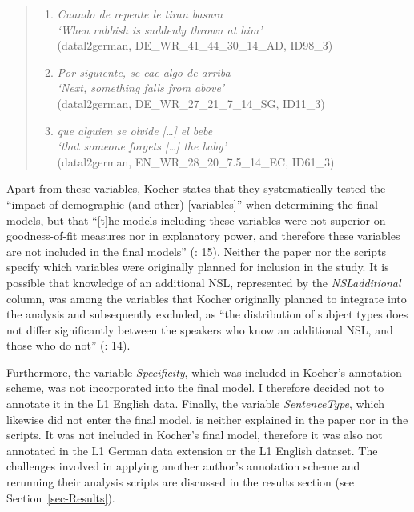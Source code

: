 \documentclass[
  letterpaper,
  DIV=11,
  numbers=noendperiod]{scrartcl}
\begin{document}
\begin{quote}
\begin{enumerate}
\def\labelenumi{\arabic{enumi}.}
\setcounter{enumi}{38}
\item
  \emph{Cuando de repente le tiran basura\\
  `\emph{When rubbish is suddenly thrown at him}'}\\
  (datal2german, DE\_WR\_41\_44\_30\_14\_AD, ID98\_3)
\item
  \emph{Por siguiente, se cae algo de arriba\\
  `\emph{Next, something falls from above}'}\\
  (datal2german, DE\_WR\_27\_21\_7\_14\_SG, ID11\_3)
\item
  \emph{que alguien se olvide {[}\ldots{]} el bebe\\
  `\emph{that someone forgets {[}\ldots{]} the baby}'}\\
  (datal2german, EN\_WR\_28\_20\_7.5\_14\_EC, ID61\_3)
\end{enumerate}
\end{quote}

Apart from these variables, Kocher states that they systematically
tested the ``impact of demographic (and other) {[}variables{]}'' when
determining the final models, but that ``{[}t{]}he models including
these variables were not superior on goodness-of-fit measures nor in
explanatory power, and therefore these variables are not included in the
final models'' (: 15).
Neither the paper nor the scripts specify which variables were
originally planned for inclusion in the study. It is possible that
knowledge of an additional NSL, represented by the \emph{NSLadditional}
column, was among the variables that Kocher originally planned to
integrate into the analysis and subsequently excluded, as ``the
distribution of subject types does not differ significantly between the
speakers who know an additional NSL, and those who do not''
(: 14).

Furthermore, the variable \emph{Specificity}, which was included in
Kocher's annotation scheme, was not incorporated into the final model. I
therefore decided not to annotate it in the L1 English data. Finally,
the variable \emph{SentenceType}, which likewise did not enter the final
model, is neither explained in the paper nor in the scripts. It was not
included in Kocher's final model, therefore it was also not annotated in
the L1 German data extension or the L1 English dataset. The challenges
involved in applying another author's annotation scheme and rerunning
their analysis scripts are discussed in the results section (see
Section~\ref{sec-Results}).
\end{document}
